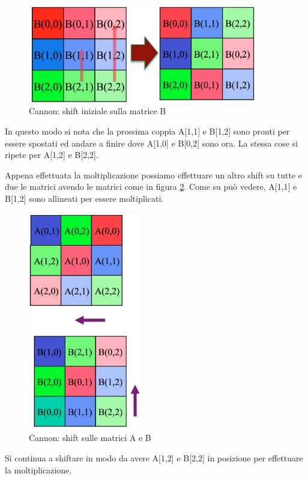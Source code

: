 \begin{figure}[htbp]
    \begin{center}
        \includegraphics[width=10cm]{immagini/cannon3.png}
    \end{center}
    \caption{Cannon: shift iniziale sulla matrice B}
    \label{fig:cannon3}
\end{figure}

In questo modo si nota che la prossima coppia A[1,1] e B[1,2] sono pronti per essere spostati ed andare a finire dove A[1,0] e B[0,2] sono ora. La stessa cose si ripete per A[1,2] e B[2,2].

Appena effettuata la moltiplicazione possiamo effettuare un altro shift su tutte e due le matrici avendo le matrici come in figura \ref{fig:cannon4}. Come su pu\`{o} vedere, A[1,1] e B[1,2] sono allineati per essere moltiplicati.

\begin{figure}[htbp]
    \begin{center}
        \includegraphics[width=5cm]{immagini/cannon4.png}
    \end{center}
    \caption{Cannon: shift sulle matrici A e B}
    \label{fig:cannon4}
\end{figure}

Si continua a shiftare in modo da avere A[1,2] e B[2,2] in posizione per effettuare la moltiplicazione.
